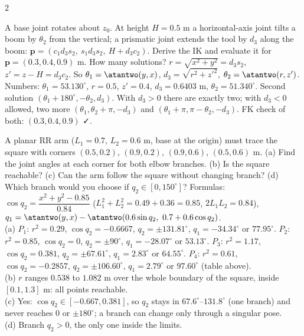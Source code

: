 \begin{multicols}{2}
\begin{examq}
A base joint rotates about $z_0$. At height $H=0.5$ m a horizontal-axis joint tilts a boom by $\theta_2$ from the vertical; a prismatic joint extends the tool by $d_3$ along the boom: $\mathbf p=(c_1d_3s_2,\ s_1d_3s_2,\ H+d_3c_2)$. Derive the IK and evaluate it for $\mathbf p=(0.3,0.4,0.9)$ m. How many solutions?
\solution
$r=\sqrt{x^2+y^2}=d_3s_2$, $z'=z-H=d_3c_2$. So $\theta_1=\atantwo(y,x)$, $d_3=\sqrt{r^2+z'^2}$, $\theta_2=\atantwo(r,z')$. Numbers: $\theta_1=53.130^\circ$, $r=0.5$, $z'=0.4$, $d_3=0.6403$ m, $\theta_2=51.340^\circ$. Second solution $(\theta_1+180^\circ,-\theta_2,d_3)$. With $d_3>0$ there are exactly two; with $d_3<0$ allowed, two more $(\theta_1,\theta_2+\pi,-d_3)$ and $(\theta_1+\pi,\pi-\theta_2,-d_3)$. FK check of both: $(0.3,0.4,0.9)$ ✓. \chk
\end{examq}

\begin{examq}
A planar RR arm ($L_1=0.7$, $L_2=0.6$ m, base at the origin) must trace the square with corners $(0.5,0.2)$, $(0.9,0.2)$, $(0.9,0.6)$, $(0.5,0.6)$ m. (a) Find the joint angles at each corner for both elbow branches. (b) Is the square reachable? (c) Can the arm follow the square without changing branch? (d) Which branch would you choose if $q_2\in[0,150^\circ]$?
\solution
Formulas: $\cos q_2=\dfrac{x^2+y^2-0.85}{0.84}$ ($L_1^2+L_2^2=0.49+0.36=0.85$, $2L_1L_2=0.84$), $q_1=\atantwo(y,x)-\atantwo(0.6\sin q_2,\ 0.7+0.6\cos q_2)$.\\
(a) $P_1$: $r^2=0.29$, $\cos q_2=-0.6667$, $q_2=\pm131.81^\circ$, $q_1=-34.34^\circ$ or $77.95^\circ$. $P_2$: $r^2=0.85$, $\cos q_2=0$, $q_2=\pm90^\circ$, $q_1=-28.07^\circ$ or $53.13^\circ$. $P_3$: $r^2=1.17$, $\cos q_2=0.381$, $q_2=\pm67.61^\circ$, $q_1=2.83^\circ$ or $64.55^\circ$. $P_4$: $r^2=0.61$, $\cos q_2=-0.2857$, $q_2=\pm106.60^\circ$, $q_1=2.79^\circ$ or $97.60^\circ$ (table above).\\
(b) $r$ ranges $0.538$ to $1.082$ m over the whole boundary of the square, inside $[0.1,1.3]$ m: all points reachable.\\
(c) Yes: $\cos q_2\in[-0.667,0.381]$, so $q_2$ stays in $67.6^\circ$--$131.8^\circ$ (one branch) and never reaches $0$ or $\pm180^\circ$; a branch can change only through a singular pose.\\
(d) Branch $q_2>0$, the only one inside the limits. \chk
\end{examq}


\end{multicols}
